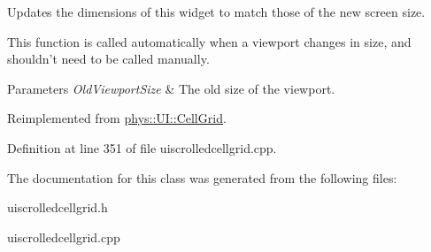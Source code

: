 Updates the dimensions of this widget to match those of the new screen size. 

This function is called automatically when a viewport changes in size, and shouldn't need to be called manually. 
\begin{DoxyParams}{Parameters}
{\em OldViewportSize} & The old size of the viewport. \\
\hline
\end{DoxyParams}


Reimplemented from \hyperlink{classphys_1_1UI_1_1CellGrid_addbc1338b3b321018cbaf3ff787837e5}{phys::UI::CellGrid}.



Definition at line 351 of file uiscrolledcellgrid.cpp.



The documentation for this class was generated from the following files:\begin{DoxyCompactItemize}
\item 
uiscrolledcellgrid.h\item 
uiscrolledcellgrid.cpp\end{DoxyCompactItemize}
